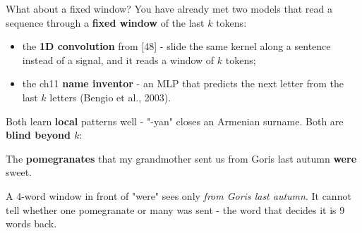 \documentclass[aspectratio=169]{beamer}
\begin{document}
\begin{frame}{What about a fixed window?}
  \small
  You have already met two models that read a sequence through a \textbf{fixed window}
  of the last $k$ tokens:
  \begin{itemize}
    \item the \textbf{1D convolution} from [48] - slide the same kernel along a sentence
      instead of a signal, and it reads a window of $k$ tokens;
    \item the ch11 \textbf{name inventor} - an MLP that predicts the next letter from the
      last $k$ letters (Bengio et al., 2003).
  \end{itemize}
  Both learn \textbf{local} patterns well - "-yan" closes an Armenian surname. Both are
  \textbf{blind beyond $k$}:
  \vskip 6pt
  \begin{center}
    The \textbf{pomegranates} that my grandmother sent us
    \colorbox{armorange!30}{from Goris last autumn} \textbf{were} sweet.
  \end{center}
  \vskip 2pt
  A 4-word window in front of "were" sees only \emph{from Goris last autumn}. It cannot
  tell whether one pomegranate or many was sent - the word that decides it is 9 words
  back.
  \vskip 6pt
\end{frame}
\end{document}
